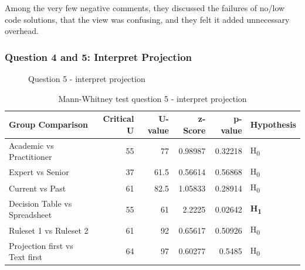 Among the very few negative comments, they discussed the failures of no/low code solutions, that the view was confusing, and they felt it added unnecessary overhead.

\subsubsection{Question 4 and 5: Interpret Projection}

\begin{figure}[H]
    \centering
    \caption{Question 5 - interpret projection}
    \label{fig:stackedbar_Q2}
\end{figure}

\begin{table}[H]
    \begin{center}
        \begin{tabular}{ |l ||r |r |r | r|l | } 
            \hline
            Group Comparison                 & Critical U & U-value & z-Score  & p-value & Hypothesis         \\
            \hline
            \hline
            Academic vs Practitioner         & 55        & 77      &  0.98987  & 0.32218 & H\textsubscript{0} \\ 
            \hline
            Expert vs Senior                 & 37        & 61.5    &  0.56614  & 0.56868 & H\textsubscript{0} \\ 
            \hline
            Current vs Past                  & 61        & 82.5    &  1.05833  & 0.28914 & H\textsubscript{0} \\ 
            \hline
            Decision Table vs Spreadsheet    & 55        & 61      &  2.2225   & 0.02642 & \textbf{H\textsubscript{1}}  \\ 
            \hline
            Ruleset 1 vs Ruleset 2           & 61        & 92      &  0.65617  & 0.50926 & H\textsubscript{0} \\ 
            \hline
            Projection first vs Text first   & 64        & 97      &  0.60277  & 0.5485  & H\textsubscript{0} \\ 
            \hline
        \end{tabular}
    \end{center}
    \caption{Mann-Whitney test question 5 - interpret projection}
    \label{table:mannwhitneyQ2}
\end{table}

